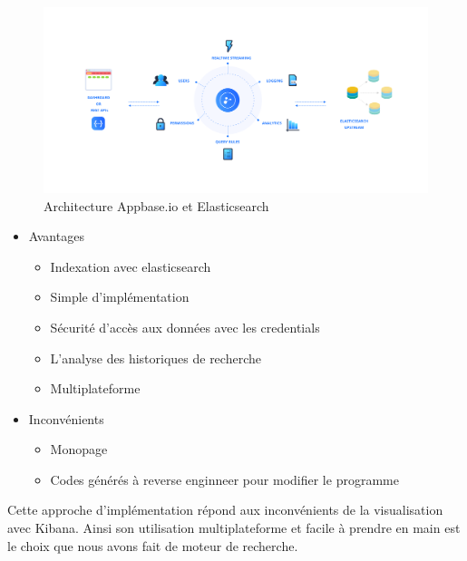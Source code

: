 \begin{figure}[h!]
  \centering
  \includegraphics[width=\textwidth]{images/ArchitectureElasticsearchAppbase.png}
	\caption[]{Architecture Appbase.io et Elasticsearch}
  \label{}
\end{figure}

\newpage
\begin{itemize}
    \item Avantages 
        \begin{itemize}
            \item Indexation avec elasticsearch
            \item Simple d’implémentation
            \item Sécurité d’accès aux données avec les credentials
            \item L’analyse des historiques de recherche
            \item Multiplateforme
        \end{itemize}
    \item Inconvénients 
        \begin{itemize}
        \item Monopage
        \item Codes générés à reverse enginneer pour modifier le programme
        \end{itemize}
\end{itemize}

Cette approche d’implémentation répond aux inconvénients de la visualisation avec Kibana. Ainsi son utilisation multiplateforme et facile à prendre en main est le choix que nous avons fait de moteur de recherche.  
